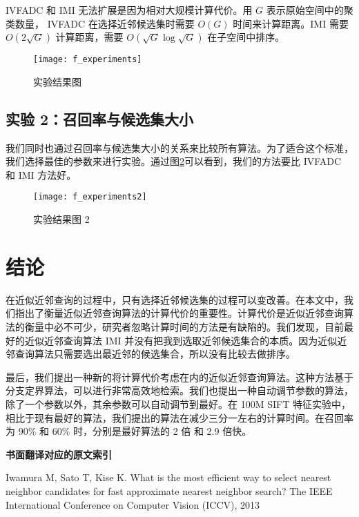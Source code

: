 IVFADC 和 IMI 无法扩展是因为相对大规模计算代价。用 $G$ 表示原始空间中的聚类数量， IVFADC 在选择近邻候选集时需要 $O(G)$ 时间来计算距离。IMI 需要 $O(2\sqrt{G})$ 计算距离，需要 $O(\sqrt{G}\log\sqrt{G})$ 在子空间中排序。
\begin{figure}[H]
  \centering
  \texttt{[image: f\_experiments]}
  \caption{实验结果图}
  \label{fig:f_experiments}
\end{figure}
\subsection{实验 2：召回率与候选集大小}
我们同时也通过召回率与候选集大小的关系来比较所有算法。为了适合这个标准，我们选择最佳的参数来进行实验。通过图\ref{fig:f_experiments2}可以看到，我们的方法要比 IVFADC 和 IMI 方法好。
\begin{figure}[H]
  \centering
  \texttt{[image: f\_experiments2]}
  \caption{实验结果图 2}
  \label{fig:f_experiments2}
\end{figure}
\section{结论}
在近似近邻查询的过程中，只有选择近邻候选集的过程可以变改善。在本文中，我们指出了衡量近似近邻查询算法的计算代价的重要性。计算代价是近似近邻查询算法的衡量中必不可少，研究者忽略计算时间的方法是有缺陷的。我们发现，目前最好的近似近邻查询算法 IMI 并没有把我到选取近邻候选集合的本质。因为近似近邻查询算法只需要选出最近邻的候选集合，所以没有比较去做排序。

最后，我们提出一种新的将计算代价考虑在内的近似近邻查询算法。这种方法基于分支定界算法，可以进行非常高效地检索。我们也提出一种自动调节参数的算法，除了一个参数以外，其余参数可以自动调节到最好。在 100M SIFT 特征实验中，相比于现有最好的算法，我们提出的算法在减少三分一左右的计算时间。在召回率为 90\% 和 60\% 时，分别是最好算法的 2 倍 和 2.9 倍快。
\begin{center}
\textbf{书面翻译对应的原文索引}
\end{center}

\begin{enumerate}[{$[$}1{$]$}]
\item Iwamura M, Sato T, Kise K. What is the most efficient way to select nearest neighbor candidates for fast approximate nearest neighbor search? The IEEE International Conference on Computer Vision (ICCV), 2013
\end{enumerate}
